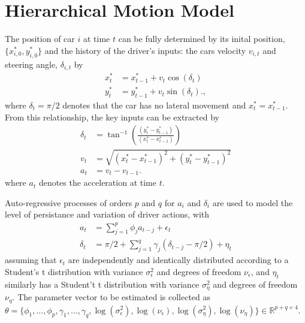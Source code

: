 \documentclass[12pt,a4paper]{article}\usepackage[]{graphicx}\usepackage[]{color}
\begin{document}
\section{Hierarchical Motion Model}

The position of car $i$ at time $t$ can be fully determined by its inital position, $\{x^*_{i, 0}, y^*_{i, 0}\}$ and the history of the driver's inputs: the cars velocity $v_{i, t}$ and steering angle, $\delta_{i, t}$ by
\begin{align}
x^*_{t} &= x^*_{t-1} + v_{t} \cos(\delta_{t}) \label{xEq} \\
y^*_{t} &= y^*_{t-1} + v_{t} \sin(\delta_{t}). \label{yEq},
\end{align}
where $\delta_{t} = \pi/2$ denotes that the car has no lateral movement and $x^*_{t} = x^*_{t-1}$.
From this relationship, the key inputs can be extracted by
\begin{align}
\delta_{t} &= \tan^{-1}\left(\frac{(y^*_{t} - y^*_{t-1})}{(x^*_{t} - x^*_{t-1})} \right) \label{dEq} \\
v_{t} &= \sqrt{(x^*_{t} - x^*_{t-1})^2 + (y^*_{t} - y^*_{t-1})^2} \label{vEq} \\
a_{t} &= v_{t} - v_{t-1}. \label{aEq}
\end{align}
where $a_{t}$ denotes the acceleration at time $t$.

Auto-regressive processes of orders $p$ and $q$ for $a_i$ and  $\delta_i$ are used to model the level of persistance and variation of driver actions, with
\begin{align}
a_{t} &= \sum_{j = 1}^p \phi_{j} a_{t-j} + \epsilon_{t} \label{aAR} \\
\delta_{t} &= \pi/2 + \sum_{j = 1}^q \gamma_{j} (\delta_{t-j} - \pi/2) + \eta_{t} \label{dAR}
\end{align}
assuming that $\epsilon_{t}$ are independently and identically distributed according to a Student's t distribution with variance $\sigma^{2}_{\epsilon}$ and degrees of freedom $\nu_{\epsilon}$, and $\eta_{t}$ similarly has a Student't t distribution with variance $\sigma^{2}_{\eta}$ and degrees of freedom $\nu_{\eta}$. The parameter vector to be estimated is collected as $\theta = \{\phi_{1}, \dots, \phi_{p}, \gamma_{1}, \dots, \gamma_{q}, \log(\sigma^{2}_{\epsilon}), \log(\nu_{\epsilon}), \log(\sigma^{2}_{\eta}), \log(\nu_{\eta}) \} \in \mathbb{R}^{p + q + 4}$.
\end{document}
